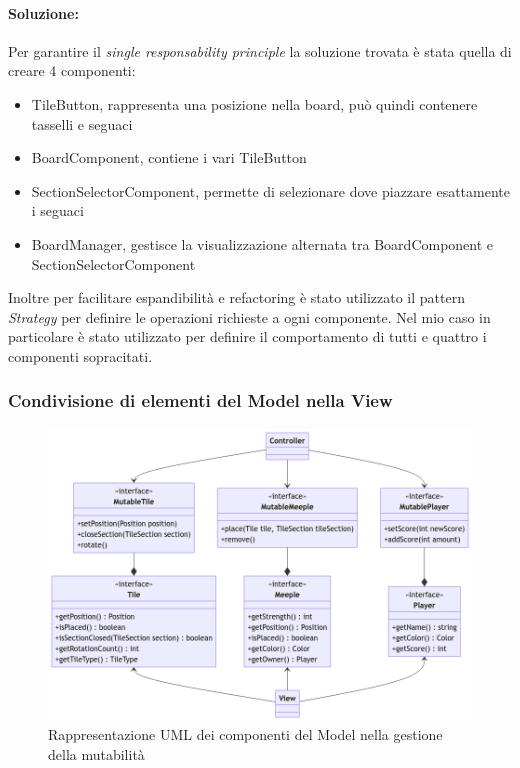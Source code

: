 \paragraph{Soluzione:}
Per garantire il \textit{single responsability principle} la soluzione trovata è stata quella di creare 4 componenti:
\begin{itemize}
    \item TileButton, rappresenta una posizione nella board, può quindi contenere tasselli e seguaci
    \item BoardComponent, contiene i vari TileButton
    \item SectionSelectorComponent, permette di selezionare dove piazzare esattamente i seguaci
    \item BoardManager, gestisce la visualizzazione alternata tra BoardComponent e SectionSelectorComponent
\end{itemize}
Inoltre per facilitare espandibilità e refactoring è stato utilizzato il pattern \textit{Strategy} per definire le operazioni richieste a ogni componente. Nel mio caso in particolare è stato utilizzato per definire il comportamento di tutti e quattro i componenti sopracitati.

\subsubsection*{Condivisione di elementi del Model nella View}
\begin{figure}[h]
    \centering\includegraphics[scale=.4]{images/uml_mutability.png}
    \caption{Rappresentazione UML dei componenti del Model nella gestione della mutabilità}
\end{figure}
